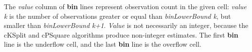 The \textit{value} column of \textbf{bin} lines represent observation
count in the given cell: \textit{value k} is the number of observations
greater or equal than \textit{binLowerBound k}, but smaller than
\textit{binLowerBound k+1}. \textit{Value} is not necessarily an
integer, because the cKSplit and cPSquare algorithms produce
non{}-integer estimates. The first \textbf{bin} line is the underflow
cell, and the last \textbf{bin} line is the overflow cell.



